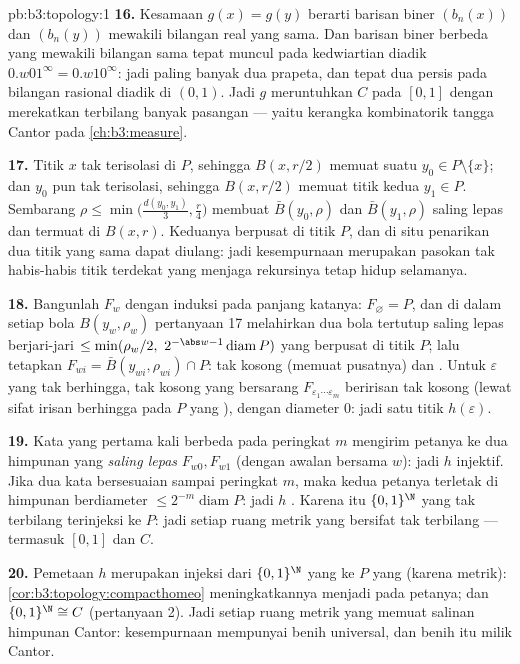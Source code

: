 \begin{solution}{pb:b3:topology:1}
\textbf{16.} Kesamaan $g(x) = g(y)$ berarti barisan biner
$(b_n(x))$ dan $(b_n(y))$ mewakili bilangan real yang sama. Dan barisan
biner berbeda yang mewakili bilangan sama tepat muncul pada
kedwiartian diadik $0.w01^\infty = 0.w10^\infty$: jadi paling banyak
dua prapeta, dan tepat dua persis pada bilangan
rasional diadik di $(0,1)$. Jadi $g$ meruntuhkan $C$ pada $[0,1]$ dengan
merekatkan terbilang banyak pasangan --- yaitu kerangka
kombinatorik tangga Cantor pada \cref{ch:b3:measure}.

\textbf{17.} Titik $x$ tak terisolasi di $P$, sehingga $B(x, r/2)$
memuat suatu $y_0 \in P \setminus \{x\}$; dan $y_0$ pun tak
terisolasi, sehingga $B(x, r/2)$ memuat titik kedua $y_1
\in P$. Sembarang $\rho \leq \min\bigl(\frac{d(y_0,y_1)}3,
\frac r4\bigr)$ membuat $\bar B(y_0, \rho)$ dan $\bar B(y_1,
\rho)$ saling lepas dan termuat di $B(x, r)$. Keduanya berpusat
di titik $P$, dan di situ penarikan dua titik yang sama dapat
diulang: jadi kesempurnaan merupakan pasokan tak habis-habis titik terdekat
yang menjaga rekursinya tetap hidup selamanya.

\textbf{18.} Bangunlah $F_w$ dengan induksi pada panjang katanya:
$F_\varnothing = P$, dan di dalam setiap bola $B(y_w, \rho_w)$
pertanyaan 17 melahirkan dua bola tertutup saling lepas berjari-jari $\leq
\min(\rho_w/2,\ 2^{-\abs w-1}\operatorname{diam}P)$ yang berpusat
di titik $P$; lalu tetapkan $F_{wi} = \bar B(y_{wi}, \rho_{wi})
\cap P$: tak kosong (memuat pusatnya) dan . Untuk
$\varepsilon$ yang tak berhingga,  tak kosong yang bersarang
$F_{\varepsilon_1\cdots\varepsilon_m}$ beririsan tak kosong (lewat sifat irisan
berhingga pada $P$ yang ), dengan diameter $0$: jadi satu titik $h(\varepsilon)$.

\textbf{19.} Kata yang pertama kali berbeda pada peringkat $m$ mengirim
petanya ke dua himpunan yang \emph{saling lepas} $F_{w0}, F_{w1}$
(dengan awalan bersama $w$): jadi $h$ injektif. Jika dua kata bersesuaian sampai
peringkat $m$, maka kedua petanya terletak di himpunan berdiameter $\leq
2^{-m}\operatorname{diam}P$: jadi $h$ . Karena itu
$\{0,1\}^\N$ yang tak terbilang terinjeksi ke $P$: jadi setiap ruang metrik 
yang  bersifat tak terbilang --- termasuk $[0,1]$ dan $C$.

\textbf{20.} Pemetaan $h$ merupakan injeksi  dari $\{0,1\}^\N$
yang  ke $P$ yang  (karena metrik):
\cref{cor:b3:topology:compacthomeo} meningkatkannya menjadi
 pada petanya; dan $\{0,1\}^\N \cong C$
(pertanyaan 2). Jadi setiap ruang metrik  yang  memuat
salinan himpunan Cantor: kesempurnaan mempunyai benih universal, dan
benih itu milik Cantor.


\end{solution}
